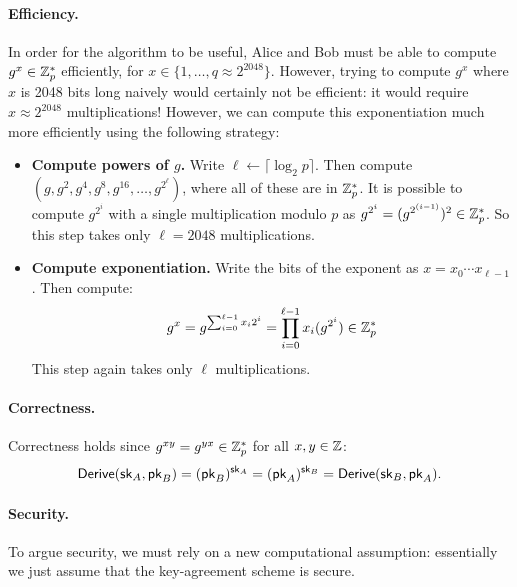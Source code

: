 \paragraph{Efficiency.} In order for the algorithm to be useful,
Alice and Bob must be able to compute $g^x \in \mathbb{Z}^*_p$ efficiently,
for $x \in \{1, \dots, q \approx 2^{2048}\}$.
However, trying to compute $g^x$ where $x$ is 2048
bits long naively would certainly not be
efficient: it would require $x \approx 2^{2048}$ multiplications!
However, we can compute this exponentiation much more efficiently using
the following strategy:
\begin{itemize}[noitemsep]
  \item \textbf{Compute powers of $g$.}
        Write $\ell \gets \lceil \log_2 p \rceil$.
        Then compute $(g, g^2, g^4, g^{8}, g^{16}, \dots, g^{2^\ell})$,
        where all of these are in $\mathbb{Z}^*_p$.
        It is possible to compute $g^{2^{i}}$ with a single multiplication
        modulo $p$ as $g^{2^i} = (g^{2^{(i-1)}})^2 \in \mathbb{Z}^*_p$.
        So this step takes only $\ell = 2048$ multiplications.
  \item \textbf{Compute exponentiation.}
        Write the bits of the exponent as $x = x_0 \cdots x_{\ell-1}$.
        Then compute:
        \[ g^x = g^{\sum_{i = 0}^{\ell-1} x_i 2^i} = \prod_{i=0}^{\ell-1} x_i(g^{2^i}) \in \mathbb{Z}^*_p\] 
        This step again takes only $\ell$ multiplications.
\end{itemize}


\paragraph{Correctness.}
Correctness holds since $g^{xy}=g^{yx} \in \mathbb{Z}^*_p$ for all $x,y \in \mathbb{Z}$:
\begin{align*}
  \mathsf{Derive}({\mathsf{sk}}_A, \mathsf{pk}_B) = (\mathsf{pk}_B)^{{\mathsf{sk}}_A} = (\mathsf{pk}_A)^{{\mathsf{sk}}_B} = \mathsf{Derive}({\mathsf{sk}}_B, \mathsf{pk}_A).
\end{align*}


\paragraph{Security.}
To argue security, we must rely on a new computational assumption:
essentially we just assume that the key-agreement scheme is secure.

